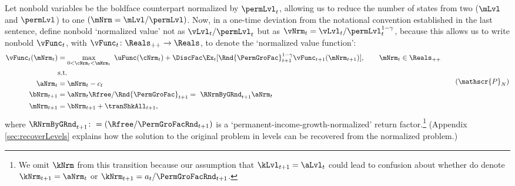 \documentclass[BufferStockTheory]{subfiles}
\begin{document}
Let nonbold variables be the boldface counterpart normalized by $\permLvl_{t}$, allowing us to reduce the number of states from two ($\mLvl$ and $\permLvl$) to one $(\mNrm = \mLvl/\permLvl)$.
Now, in a one-time deviation from the notational convention established in the last sentence, define nonbold `normalized value' not as $\vLvl_{t}/\permLvl_{t}$ but as $\vNrm_{t} = \vLvl_{t}/\permLvl_{t}^{1-\CRRA}$, because this allows us to write nonbold $\vFunc_{t}$, with $\vFunc_{t}\colon \Reals_{++}\rightarrow \Reals$, to denote the `normalized value function':
%
%
\begin{equation}\label{eq:veqnNrmRecBellman}
  \begin{aligned}
    \vFunc_{t}(\mNrm_{t})  & = \max_{0<\cNrm_{t}< \mNrm_{t}}~  \uFunc(\cNrm_{t}) +\DiscFac \Ex_{t}[\Rnd{\PermGroFac}_{t+1}^{1-\CRRA}\vFunc_{t+1}({\mNrm}_{t+1})],\qquad  \mNrm_{t}\in \Reals_{++}\\
    & \mbox{s.t.}
    \\ {\aNrm}_{t}  & = \mNrm_{t}-c_{t}
    \\ {\bNrm}_{t+1} & = \aNrm_{t} \Rfree/\Rnd{\PermGroFac}_{t+1} = ~  \RNrmByGRnd_{t+1}\aNrm_{t} %
    \\ \mNrm_{t+1}  & = \bNrm_{t+1} +\tranShkAll_{t+1} ,
  \end{aligned}  \tag{$\mathscr{P}_{N}$}
\end{equation}
where $\RNrmByGRnd_{t+1}\colon = (\Rfree/\PermGroFacRnd_{t+1})$ is a `permanent-income-growth-normalized' return factor.\footnote{We omit $\kNrm$ from this transition because our assumption that $\kLvl_{t+1}=\aLvl_{t}$ could lead to confusion about whether do denote $\kNrm_{t+1}=\aNrm_{t}$ or $\kNrm_{t+1}=a_{t}/\PermGroFacRnd_{t+1}$.} %
(Appendix \ref{sec:recoverLevels} explains how the solution to the original problem in levels can be recovered from the normalized problem.)
\end{document}

